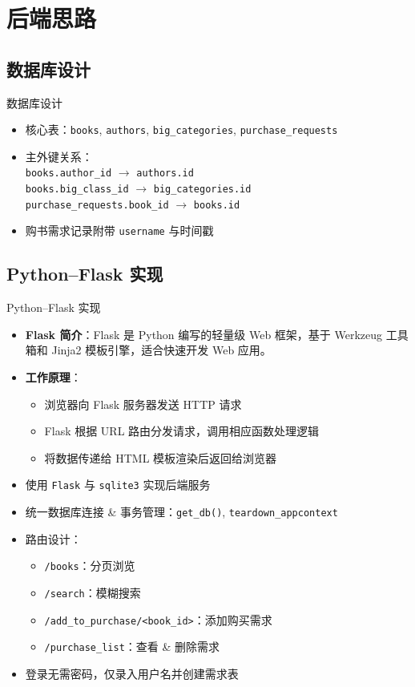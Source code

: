 \documentclass{ctexbeamer}
\begin{document}
\section{后端思路}

\subsection{数据库设计}
\begin{frame}{数据库设计}
  \begin{itemize}
    \item 核心表：\texttt{books}, \texttt{authors}, \texttt{big_categories}, \texttt{purchase_requests}
    \item 主外键关系：\\
      \texttt{books.author\_id} \ensuremath{\to} \texttt{authors.id}\\
      \texttt{books.big\_class\_id} \ensuremath{\to} \texttt{big_categories.id}\\
      \texttt{purchase\_requests.book\_id} \ensuremath{\to} \texttt{books.id}
    \item 购书需求记录附带 \texttt{username} 与时间戳
  \end{itemize}
\end{frame}

\subsection{Python–Flask 实现}
\begin{frame}{Python–Flask 实现}
  \begin{itemize}
    \item \textbf{Flask 简介}：Flask 是 Python 编写的轻量级 Web 框架，基于 Werkzeug 工具箱和 Jinja2 模板引擎，适合快速开发 Web 应用。
    \item \textbf{工作原理}：
      \begin{itemize}
        \item 浏览器向 Flask 服务器发送 HTTP 请求
        \item Flask 根据 URL 路由分发请求，调用相应函数处理逻辑
        \item 将数据传递给 HTML 模板渲染后返回给浏览器
      \end{itemize}
    \item 使用 \texttt{Flask} 与 \texttt{sqlite3} 实现后端服务
    \item 统一数据库连接 \& 事务管理：\texttt{get\_db()}, \texttt{teardown\_appcontext}
    \item 路由设计：
      \begin{itemize}
        \item \texttt{/books}：分页浏览
        \item \texttt{/search}：模糊搜索
        \item \texttt{/add\_to\_purchase/<book\_id>}：添加购买需求
        \item \texttt{/purchase\_list}：查看 \& 删除需求
      \end{itemize}
    \item 登录无需密码，仅录入用户名并创建需求表
  \end{itemize}
\end{frame}
\end{document}
